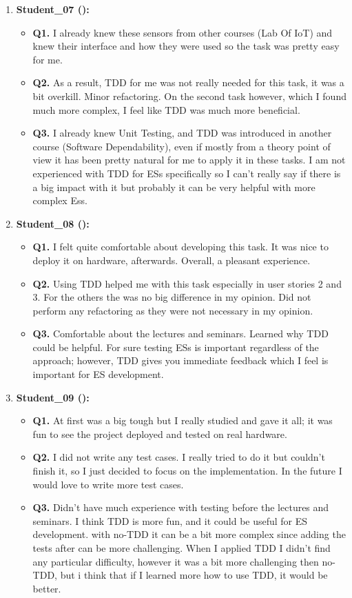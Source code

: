 \begin{enumerate}
    \item \textbf{Student\_07 (\tdd):}
    \begin{itemize}
        \item \textbf{Q1.} I already knew these sensors from other courses (Lab Of IoT) and knew their interface and how they were used so the task was pretty easy for me.
        \item \textbf{Q2.} As a result, TDD for me was not really needed for this task, it was a bit overkill. Minor refactoring. On the second task however, which I found much more complex, I feel like TDD was much more beneficial. 
        \item \textbf{Q3.} I already knew Unit Testing, and TDD was introduced in another course (Software Dependability), even if mostly from a theory point of view it has been pretty natural for me to apply it in these tasks. I am not experienced with TDD  for ESs specifically so I can’t really say if there is a big impact with it but probably it can be very helpful with more complex Ess.
    \end{itemize}

    \item \textbf{Student\_08 (\tdd):}
    \begin{itemize}
        \item \textbf{Q1.} I felt quite comfortable about developing this task. It was nice to deploy it on hardware, afterwards. Overall, a pleasant experience.
        \item \textbf{Q2.} Using TDD helped me with this task especially in user stories 2 and 3. For the others the was no big   difference in my opinion. Did not perform any refactoring as they were not necessary in my opinion.
        \item \textbf{Q3.} Comfortable about the lectures and seminars. Learned why TDD could be helpful. For sure testing ESs is important regardless of the approach; however, TDD gives you immediate feedback which I feel is important for ES development.
    \end{itemize}

    \item \textbf{Student\_09 (\tdd):}
    \begin{itemize}
        \item \textbf{Q1.} At first was a big tough but I really studied and gave it all; it was fun to see the project deployed and tested on real hardware.
        \item \textbf{Q2.} I did not write any test cases. I really tried to do it but couldn't finish it, so I just decided to focus on the implementation. In the future I would love to write more test cases.
        \item \textbf{Q3.} Didn’t have much experience with testing before the lectures and seminars. I think TDD is more fun, and it could be useful for ES development. with no-TDD it can be a bit more complex since adding the tests after can be more challenging. When I applied TDD I didn't find any particular difficulty, however it was a bit more challenging then no-TDD, but i think that if I learned more how to use TDD, it would be better.
    \end{itemize}
\end{enumerate}
